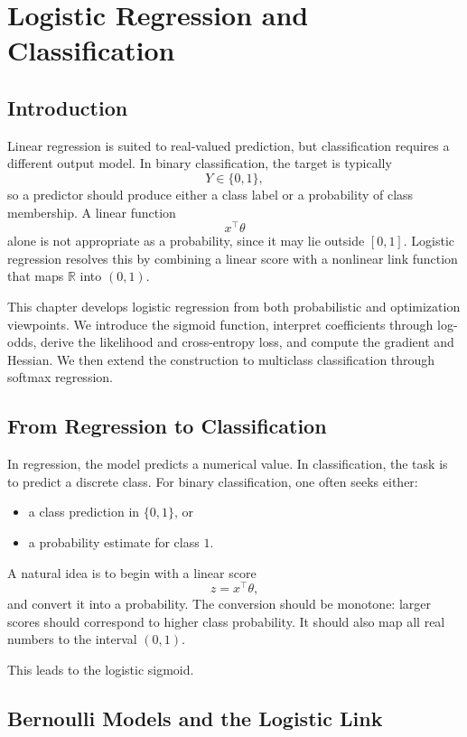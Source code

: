 \chapter{Logistic Regression and Classification}

\section{Introduction}

Linear regression is suited to real-valued prediction, but classification requires a different output model. In binary classification, the target is typically
\[
Y\in\{0,1\},
\]
so a predictor should produce either a class label or a probability of class membership. A linear function
\[
x^\top\theta
\]
alone is not appropriate as a probability, since it may lie outside $[0,1]$. Logistic regression resolves this by combining a linear score with a nonlinear link function that maps $\mathbb R$ into $(0,1)$.

This chapter develops logistic regression from both probabilistic and optimization viewpoints. We introduce the sigmoid function, interpret coefficients through log-odds, derive the likelihood and cross-entropy loss, and compute the gradient and Hessian. We then extend the construction to multiclass classification through softmax regression.

\section{From Regression to Classification}

In regression, the model predicts a numerical value. In classification, the task is to predict a discrete class. For binary classification, one often seeks either:
\begin{itemize}
    \item a class prediction in $\{0,1\}$, or
    \item a probability estimate for class $1$.
\end{itemize}

A natural idea is to begin with a linear score
\[
z=x^\top \theta,
\]
and convert it into a probability. The conversion should be monotone: larger scores should correspond to higher class probability. It should also map all real numbers to the interval $(0,1)$.

This leads to the logistic sigmoid.

\section{Bernoulli Models and the Logistic Link}

